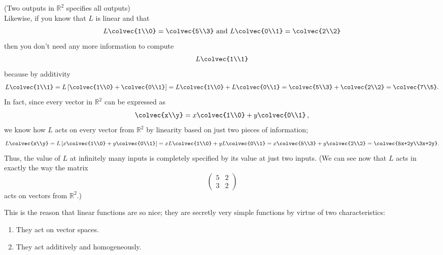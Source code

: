 \begin{example}(Two outputs in $\mathbb{R}^2$ specifies all outputs)\\
Likewise, if you  know that $L$ is linear and that
\[
L\colvec{1\\0}=\colvec{5\\3} \text{~and~} L\colvec{0\\1}= \colvec{2\\2}
\] 
then you don't need any more information to compute
\[L\colvec{1\\1}\] because by additivity
\[
L\colvec{1\\1}= L \left[ \colvec{1\\0} + \colvec{0\\1} \right] 
=L\colvec{1\\0} + L \colvec{0\\1} = \colvec{5\\3} +\colvec{2\\2} =\colvec{7\\5}.
\]
In fact, since every vector in $\mathbb{R}^2$ can be expressed as 
\[
\colvec{x\\y}= x\colvec{1\\0}+y\colvec{0\\1}\, ,
\] 
we know how $L$ acts on every vector from 
$\mathbb{R}^2$ by linearity based on just  two pieces of information;
\[
L\colvec{x\\y}
= L \left[ x\colvec{1\\0}+y\colvec{0\\1} \right]
= x L\colvec{1\\0}+y L\colvec{0\\1} 
= x \colvec{5\\3}+ y\colvec{2\\2} =\colvec{5x+2y\\3x+2y}.
\]
Thus, the value of $L$ at infinitely many inputs is completely specified by its value at just two inputs.
(We can see now that $L$ acts in exactly the way the matrix 
\[
\begin{pmatrix}
5&2\\
3&2 \end{pmatrix}
\]
acts on vectors from $\mathbb{R}^2$.)
\end{example}


This is the reason that linear functions are so nice;
they are secretly very simple functions by virtue of two characteristics:
\begin{enumerate}\item They act on vector spaces.
\item They act additively and homogeneously. 
\end{enumerate}


